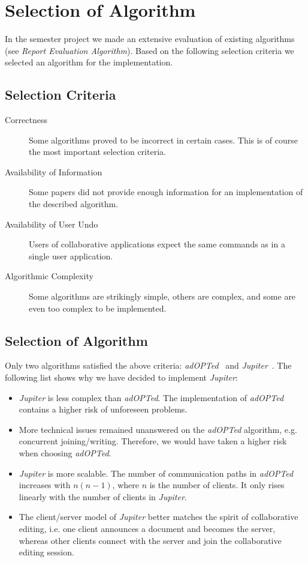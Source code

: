 \section{Selection of Algorithm}
In the semester project we made an extensive evaluation of existing algorithms
(see \emph{Report Evaluation Algorithm}). Based on the following selection
criteria we selected an algorithm for the implementation.


\subsection{Selection Criteria}

\begin{description}
\item[Correctness]
Some algorithms proved to be incorrect in certain
cases. This is of course the most important selection criteria.
\item[Availability of Information]
Some papers did not provide enough
information for an implementation of the described algorithm.
\item[Availability of User Undo]
Users of collaborative applications
expect the same commands as in a single user application. 
\item[Algorithmic Complexity]
Some algorithms are strikingly simple,
others are complex, and some are even too complex to be implemented.
\end{description}


\subsection{Selection of Algorithm}
Only two algorithms satisfied the above criteria: 
\emph{adOPTed}~\cite{ressel96} and \emph{Jupiter}~\cite{jupiter95}. The 
following list shows why we have decided to implement \emph{Jupiter}:

\begin{itemize}
 \item \emph{Jupiter} is less complex than \emph{adOPTed}. The implementation of  \emph{adOPTed} contains a higher risk of unforeseen problems. 
 \item More technical issues remained unanswered on the \emph{adOPTed} 
algorithm, e.g. concurrent joining/writing. Therefore, we would have taken a 
higher risk when choosing \emph{adOPTed}.
 \item \emph{Jupiter} is more scalable. The number of 
communication paths in \emph{adOPTed} increases with $n(n-1)$, where $n$ is the 
number of clients. It only rises linearly with the number of clients in 
\emph{Jupiter}.
 \item The client/server model of \emph{Jupiter} better matches the spirit of collaborative editing, i.e. one client announces a document and becomes the server, whereas other clients connect with the server and join the collaborative editing session.
\end{itemize}

